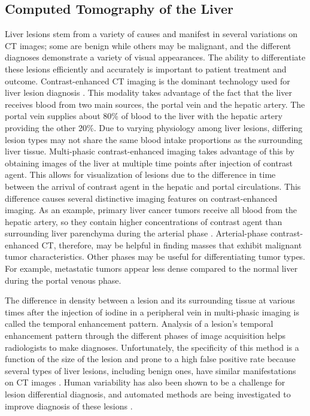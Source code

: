 \subsection{Computed Tomography of the Liver}
Liver lesions stem from a variety of causes and manifest in several variations on CT images; some are benign while others may be malignant, and the different diagnoses demonstrate a variety of visual appearances. The ability to differentiate these lesions efficiently and accurately is important to patient treatment and outcome. Contrast-enhanced CT imaging is the dominant technology used for liver lesion diagnosis \cite{Baron:1994vg}. This modality takes advantage of the fact that the liver receives blood from two main sources, the portal vein and the hepatic artery. The portal vein supplies about 80\% of blood to the liver with the hepatic artery providing the other 20\%. Due to varying physiology among liver lesions, differing lesion types may not share the same blood intake proportions as the surrounding liver tissue. Multi-phasic contrast-enhanced imaging takes advantage of this by obtaining images of the liver at multiple time points after injection of contrast agent. This allows for visualization of lesions due to the difference in time between the arrival of contrast agent in the hepatic and portal circulations. This difference causes several distinctive imaging features on contrast-enhanced imaging. As an example, primary liver cancer tumors receive all blood from the hepatic artery, so they contain higher concentrations of contrast agent than surrounding liver parenchyma during the arterial phase \cite{Lautt:1987wma,Matsui:1991vba}. Arterial-phase contrast-enhanced CT, therefore, may be helpful in finding masses that exhibit malignant tumor characteristics. Other phases may be useful for differentiating tumor types. For example, metastatic tumors appear less dense compared to the normal liver during the portal venous phase.

The difference in density between a lesion and its surrounding tissue at various times after the injection of iodine in a peripheral vein in multi-phasic imaging is called the temporal enhancement pattern. Analysis of a lesion's temporal enhancement pattern through the different phases of image acquisition helps radiologists to make diagnoses. Unfortunately, the specificity of this method is a function of the size of the lesion and prone to a high false positive rate because several types of liver lesions, including benign ones, have similar manifestations on CT images \cite{Lencioni:2005ia}. Human variability has also been shown to be a challenge for lesion differential diagnosis, and automated methods are being investigated to improve diagnosis of these lesions \cite{Armato:2007ks}. 


